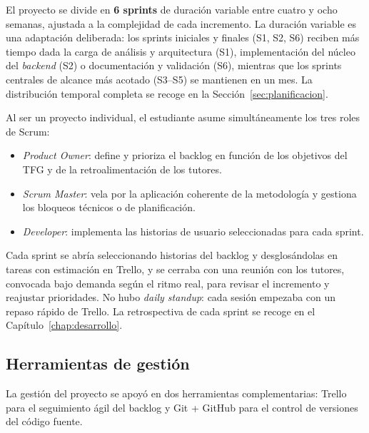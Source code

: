 \begin{definitionlist}
  \item[Sprints]  El proyecto se divide en \textbf{6 sprints} de duración
    variable entre cuatro y ocho semanas, ajustada a la complejidad de cada
    incremento.  La duración variable es una adaptación deliberada: los
    sprints iniciales y finales (S1, S2, S6) reciben más tiempo dada la
    carga de análisis y arquitectura (S1), implementación del núcleo del
    \emph{backend} (S2) o documentación y validación (S6), mientras que los
    sprints centrales de alcance más acotado (S3--S5) se mantienen en un
    mes.  La distribución temporal completa se recoge en la
    Sección~\ref{sec:planificacion}.

  \item[Roles]  Al ser un proyecto individual, el estudiante asume
    simultáneamente los tres roles de Scrum:
    \begin{itemize}
      \item \emph{Product Owner}: define y prioriza el backlog en función de
        los objetivos del \ac{TFG} y de la retroalimentación de los tutores.
      \item \emph{Scrum Master}: vela por la aplicación coherente de la
        metodología y gestiona los bloqueos técnicos o de planificación.
      \item \emph{Developer}: implementa las historias de usuario
        seleccionadas para cada sprint.
    \end{itemize}

  \item[Dinámica de trabajo]  Cada sprint se abría seleccionando historias del backlog
    y desglosándolas en tareas con estimación en Trello, y se cerraba con una
    reunión con los tutores, convocada bajo demanda según el ritmo real, para
    revisar el incremento y reajustar prioridades.  No hubo \emph{daily
    standup}: cada sesión empezaba con un repaso rápido de Trello.  La
    retrospectiva de cada sprint se recoge en el
    Capítulo~\ref{chap:desarrollo}.
\end{definitionlist}

\subsection{Herramientas de gestión}

La gestión del proyecto se apoyó en dos herramientas complementarias:
Trello para el seguimiento ágil del backlog y Git + GitHub para el
control de versiones del código fuente.

